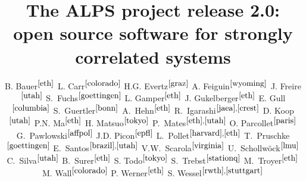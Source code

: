 \documentclass[12pt]{iopart}
\begin{document}
\title{The ALPS project release 2.0: \\ open source software for strongly correlated systems}


\newcommand{\myauthor}[3]{#2$^{#1}$}
\newcommand{\myaddress}[2]{\address{\refstepcounter{affiliation} $^{\arabic{affiliation}}$#2 \label{#1}}}

\author{
	\myauthor{\ref{eth}}{B. Bauer}{bauerb@phys.ethz.ch}
	\myauthor{\ref{colorado}}{L. Carr}{lcarr@mines.edu}
	\myauthor{\ref{graz}}{H.G. Evertz}{evertz@tugraz.at}
	\myauthor{\ref{wyoming}}{A. Feiguin}{afeiguin@uwyo.edu}
	\myauthor{\ref{utah}}{J. Freire}{juliana@cs.utah.edu}
	\myauthor{\ref{goettingen}}{S.~Fuchs}{fuchs@theorie.physik.uni-goettingen.de}
	\myauthor{\ref{eth}}{L. Gamper}{gamperl@gmail.com}
	\myauthor{\ref{eth}}{J. Gukelberger}{gukelberger@phys.ethz.ch}
	\myauthor{\ref{columbia}}{E. Gull}{gull@phys.columbia.edu}
	\myauthor{\ref{bonn}}{S.~Guertler}{guertler@th.physik.uni-bonn.de}
	\myauthor{\ref{eth}}{A.~Hehn}{hehn@phys.ethz.ch}
	\myauthor{\ref{jaea},\ref{crest}}{R.~Igarashi}{rigarash@hosi.phys.s.u-tokyo.ac.jp}
	\myauthor{\ref{utah}}{D. Koop}{dakoop@cs.utah.edu}
	\myauthor{\ref{eth}}{P.N. Ma}{pingnang@phys.ethz.ch}
	\myauthor{\ref{tokyo}}{H. Matsuo}{halm@looper.t.u-tokyo.ac.jp}
	\myauthor{\ref{eth},\ref{utah}}{P.~Mates}{phillipmates@gmail.com}
	\myauthor{\ref{paris}}{O. Parcollet}{parcolle@spht.saclay.cea.fr}
	\myauthor{\ref{affpol}}{G.~Pawlowski}{gpawlo@amu.edu.pl}
	\myauthor{\ref{epfl}}{J.D. Picon}{jean-david.picon@epfl.chl}
	\myauthor{\ref{harvard},\ref{eth}}{L.~Pollet}{pollet@phys.ethz.ch}
	\myauthor{\ref{goettingen}}{T.~Pruschke}{pruschke@theorie.physik.uni-goettingen.de}
	\myauthor{\ref{brazil},\ref{utah}}{E.~Santos}{emanuele@sci.utah.edu}
	\myauthor{\ref{virginia}}{V.W.~Scarola}{scarola@vt.edu}
	\myauthor{\ref{lmu}}{U.~Schollw\"ock}{schollwoeck@lmu.de}
	\myauthor{\ref{utah}}{C.~Silva}{csilva@sci.utah.edu}
	\myauthor{\ref{eth}}{B.~Surer}{surerb@phys.ethz.ch}
	\myauthor{\ref{tokyo}}{S. Todo}{wistaria@ap.t.u-tokyo.ac.jp}
	\myauthor{\ref{stationq}}{S.~Trebst}{trebst@kitp.ucsb.edu}
	\myauthor{\ref{eth}}{M.~Troyer}{troyer@ethz.ch}
	\myauthor{\ref{colorado}}{M. Wall}{mwall@mymail.mines.edu}
	\myauthor{\ref{eth}}{P. Werner}{werner@phys.ethz.ch}
	\myauthor{\ref{rwth},\ref{stuttgart}}{S. Wessel}{wessel@phys.ethz.ch}
}
\end{document}

